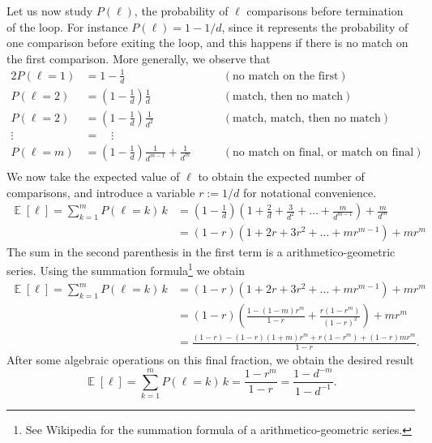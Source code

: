 \documentclass[12pt, a4paper]{article}
\DeclareMathOperator{\E}{\mathbb{E}}
\begin{document}
{Let us now study $P(\ell)$, the probability of $\ell$ comparisons before termination of the loop. 
For instance $P(\ell) = 1 - 1/d$, since it represents the probability of one comparison before exiting the loop, and this happens if there is no match on the first comparison.
More generally, we observe that
\begin{alignat*}{2}
	P(\ell = 1) &= 1 - \frac{1}{d} &\qquad (\text{no match on the first}) \\
	P(\ell = 2) &= \left(1 - \frac{1}{d}\right) \frac{1}{d} &\qquad (\text{match, then no match}) \\
	P(\ell = 2) &= \left(1 - \frac{1}{d}\right) \frac{1}{d^2} &\qquad (\text{match, match, then no match}) \\
	\vdots \quad &= \quad \vdots &  \\
	P(\ell = m) &= \left(1 - \frac{1}{d}\right) \frac{1}{d^{m-1}} + \frac{1}{d^m} &\qquad (\text{no match on final, or match on final}) \\
\end{alignat*}
We now take the expected value of $\ell$ to obtain the expected number of comparisons, and introduce a variable $r := 1/d$ for notational convenience.
\begin{align*}
	\E \left[ \ell \right] = \sum_{k=1}^{m} P(\ell = k) \, k
	& = \left(1 - \frac{1}{d}\right) \left( 1 + \frac{2}{d} + \frac{3}{d^2} + \dots + \frac{m}{d^{m-1}} \right) + \frac{m}{d^m} \\
	& = \left(1 - r\right) \left( 1 + 2r + 3r^2 + \dots + m r^{m-1} \right) + m r^m 
\end{align*}
The sum in the second parenthesis in the first term is a arithmetico-geometric series.
Using the summation formula\footnote{See Wikipedia for the summation formula of a arithmetico-geometric series.} we obtain
\begin{align*}
\E \left[ \ell \right] = \sum_{k=1}^{m} P(\ell = k) \, k
& =\left(1 - r\right) \left( 1 + 2r + 3r^2 + \dots + m r^{m-1} \right) + m r^m \\
&=\left(1 - r\right) \left( 
\frac{1 - (1-m) r^m}{1 - r}
+ 
\frac{r(1 - r^m)}{(1 - r)^2}
 \right) + m r^m \\
 &=
 \frac{(1-r) - (1-r)(1+m)r^m + r(1-r^m) + (1-r)mr^m}{1-r}.
\end{align*}
After some algebraic operations on this final fraction, we obtain the desired result 
\begin{equation*}
	\E \left[ \ell \right] = \sum_{k=1}^{m} P(\ell = k) \, k = \frac{1 - r^m}{1 - r} = \frac{1 - d^{-m}}{1 - d^{-1}}.

\end{equation*}}
\end{document}
